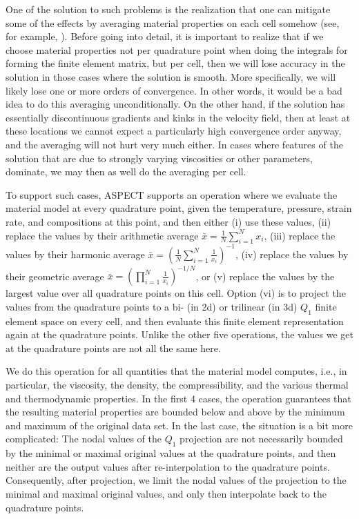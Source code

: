 \documentclass{article}
\newcommand{\aspect}{\textsc{ASPECT}}
\begin{document}
One of the solution to such problems is the realization that one can mitigate
some of the effects by averaging material properties on each cell somehow
(see, for example, \cite{Bab08,Deu08,DMGT11,Thi15,TMK14}).
Before going into detail, it is important to realize that if we choose material
properties not per quadrature point when doing the integrals for forming the
finite element matrix, but per cell, then we will lose accuracy in the solution
in those cases where the solution is smooth. More specifically, we will likely
lose one or more orders of convergence. In other words, it would be a bad idea
to do this averaging unconditionally. On the other hand, if the solution has
essentially discontinuous gradients and kinks in the velocity field, then at
least at these locations we cannot expect a particularly high convergence order
anyway, and the averaging will not hurt very much either. In cases where
features of the solution that are due to strongly varying viscosities or other
parameters, dominate, we may then as well do the averaging per cell.

To support such cases, \aspect{} supports an operation where we evaluate the
material model at every quadrature point, given the temperature, pressure,
strain rate, and compositions at this point, and then either (i) use these
values, (ii) replace the values by their arithmetic average $\bar x = \frac 1N
\sum_{i=1}^N x_i$, (iii) replace the values by their harmonic average $\bar x
= \left(\frac 1N \sum_{i=1}^N \frac{1}{x_i}\right)^{-1}$, (iv) replace the
values by their geometric average $\bar x
= \left(\prod_{i=1}^N \frac{1}{x_i}\right)^{-1/N}$,
or (v) replace the
values by the largest value over all quadrature points on this cell. Option
(vi) is to project the values from the quadrature points to a bi- (in 2d) or
trilinear (in 3d) $Q_1$ finite element space on every cell, and then evaluate this
finite element representation again at the quadrature points. Unlike the other
five operations, the values we get at the quadrature points are not all the
same here.

We do this operation for all quantities that the material model computes,
i.e., in particular, the viscosity, the density, the compressibility, and the
various thermal and thermodynamic properties. In the first 4 cases, the
operation guarantees that the resulting material properties are bounded below
and above by the minimum and maximum of the original data set. In the last
case, the situation is a bit more complicated: The nodal values of the $Q_1$
projection are not necessarily bounded by the minimal or maximal original
values at the quadrature points, and then neither are the output values after
re-interpolation to the quadrature points. Consequently, after projection, we
limit the nodal values of the projection to the minimal and maximal original
values, and only then interpolate back to the quadrature points.
\end{document}
